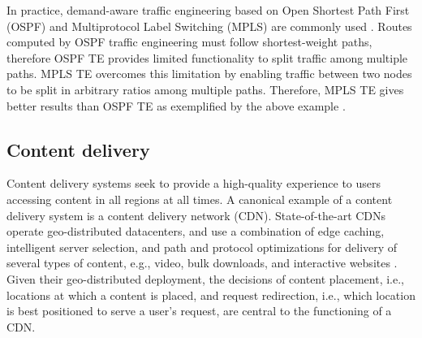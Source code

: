 In practice, demand-aware traffic engineering based on Open Shortest Path First (OSPF) and Multiprotocol Label Switching (MPLS) are commonly used  \cite{COPE,MultiTM,fortz2000internet,MPLS2}. Routes computed by OSPF traffic engineering must follow shortest-weight paths, therefore OSPF TE provides limited functionality to split traffic among multiple paths. MPLS TE overcomes this limitation by enabling traffic between two nodes to be split  in arbitrary ratios among multiple paths. Therefore, MPLS TE gives better results than OSPF TE as exemplified by the above example \cite{COPE,MultiTM}.



%
%
%


\subsection{Content delivery}
\label{sec:ch2-cdn}

Content delivery systems seek to provide a high-quality experience to users accessing content in all regions  at all times. A canonical example of a content delivery system is a content delivery network (CDN). State-of-the-art CDNs operate geo-distributed datacenters, and use a combination of edge caching, intelligent server selection, and path and protocol optimizations for delivery of several types of content, e.g., video, bulk downloads, and interactive websites \cite{DilleyMPPSW02,akamai-overview}. Given their geo-distributed deployment, the decisions of content placement, i.e., locations at which a content is placed, and request redirection, i.e., which location is best positioned to serve a user's request, are central to the functioning of a CDN.

